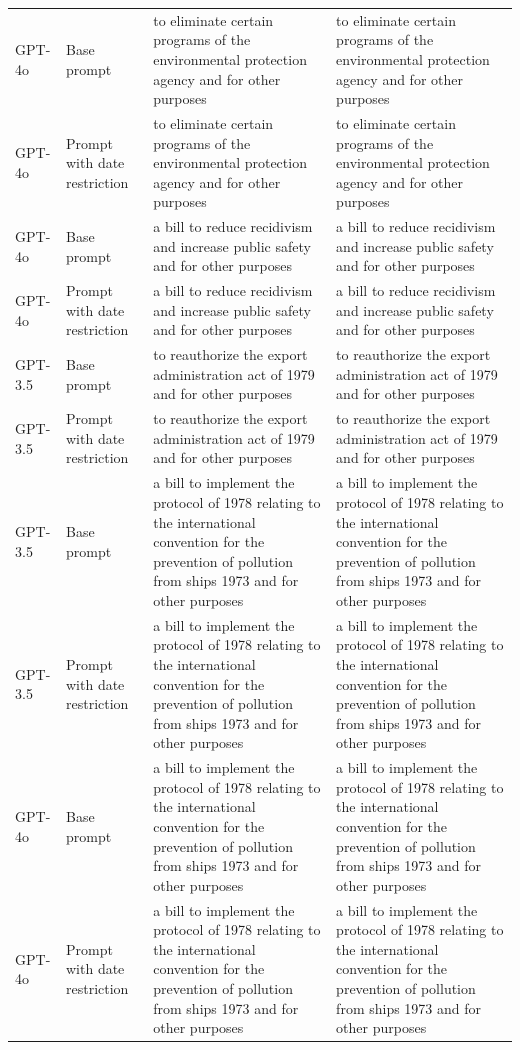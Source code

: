 \begin{longtable}{>{\raggedright\arraybackslash}p{1.4cm}>{\raggedright\arraybackslash}p{1.4cm}>{\raggedright\arraybackslash}p{5.5cm}>{\raggedright\arraybackslash}p{5.5cm}}
GPT-4o & Base prompt & to eliminate certain programs of the environmental protection agency and for other purposes & to eliminate certain programs of the environmental protection agency and for other purposes\\
GPT-4o & Prompt with date restriction & to eliminate certain programs of the environmental protection agency and for other purposes & to eliminate certain programs of the environmental protection agency and for other purposes\\
GPT-4o & Base prompt & a bill to reduce recidivism and increase public safety and for other purposes & a bill to reduce recidivism and increase public safety and for other purposes\\
GPT-4o & Prompt with date restriction & a bill to reduce recidivism and increase public safety and for other purposes & a bill to reduce recidivism and increase public safety and for other purposes\\
GPT-3.5 & Base prompt & to reauthorize the export administration act of 1979 and for other purposes & to reauthorize the export administration act of 1979 and for other purposes\\
GPT-3.5 & Prompt with date restriction & to reauthorize the export administration act of 1979 and for other purposes & to reauthorize the export administration act of 1979 and for other purposes\\
GPT-3.5 & Base prompt & a bill to implement the protocol of 1978 relating to the international convention for the prevention of pollution from ships 1973 and for other purposes & a bill to implement the protocol of 1978 relating to the international convention for the prevention of pollution from ships 1973 and for other purposes\\
GPT-3.5 & Prompt with date restriction & a bill to implement the protocol of 1978 relating to the international convention for the prevention of pollution from ships 1973 and for other purposes & a bill to implement the protocol of 1978 relating to the international convention for the prevention of pollution from ships 1973 and for other purposes\\
GPT-4o & Base prompt & a bill to implement the protocol of 1978 relating to the international convention for the prevention of pollution from ships 1973 and for other purposes & a bill to implement the protocol of 1978 relating to the international convention for the prevention of pollution from ships 1973 and for other purposes\\
GPT-4o & Prompt with date restriction & a bill to implement the protocol of 1978 relating to the international convention for the prevention of pollution from ships 1973 and for other purposes & a bill to implement the protocol of 1978 relating to the international convention for the prevention of pollution from ships 1973 and for other purposes\\

\end{longtable}
